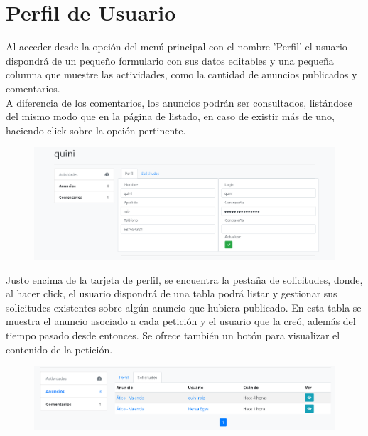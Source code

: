 \section{Perfil de Usuario}

Al acceder desde la opci\'{o}n del men\'{u} principal con el nombre 'Perfil' el usuario dispondr\'{a} de un peque\~{n}o formulario con sus datos editables y una peque\~{n}a columna que muestre las actividades, como la cantidad de anuncios publicados y comentarios. \\

A diferencia de los comentarios, los anuncios podr\'{a}n  ser consultados, list\'{a}ndose del mismo modo que en la p\'{a}gina de listado, en caso de existir m\'{a}s de uno, haciendo click sobre la opci\'{o}n pertinente. 


\begin{figure}[h!]
\centering
\includegraphics[width=1\textwidth]{Img/ManualUsuario/USER_PROFILE_EDIT.png}
\end{figure}

Justo encima de la tarjeta de perfil, se encuentra la pesta\~{n}a de solicitudes, donde, al hacer click,  el usuario dispondr\'{a} de una tabla  podr\'{a} listar y gestionar sus solicitudes existentes sobre alg\'{u}n anuncio que hubiera publicado. En esta tabla se muestra el anuncio asociado a cada petici\'{o}n y el usuario que la cre\'{o}, adem\'{a}s del tiempo pasado desde entonces. Se ofrece tambi\'{e}n un bot\'{o}n para visualizar el contenido de la petici\'{o}n.

\begin{figure}[h!]
\centering
\includegraphics[width=1\textwidth]{Img/ManualUsuario/USER_REQUESTS.png}
\end{figure}

